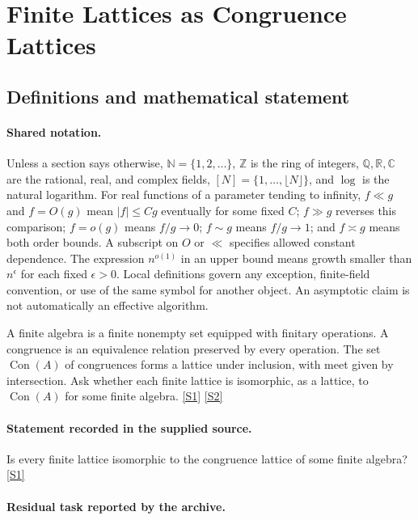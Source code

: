 \documentclass[11pt,a4paper]{article}
\newcommand{\N}{\mathbb{N}}
\newcommand{\Z}{\mathbb{Z}}
\newcommand{\Q}{\mathbb{Q}}
\newcommand{\R}{\mathbb{R}}
\newcommand{\C}{\mathbb{C}}
\newcommand{\sref}[2]{\hyperlink{source:#1:#2}{[S#2]}}
\begin{document}
\section{Finite Lattices as Congruence Lattices}\label{statement}


\subsection{Definitions and mathematical statement}

\paragraph{Shared notation.}Unless a section says otherwise, $\N=\{1,2,\ldots\}$,
$\Z$ is the ring of integers, $\Q,\R,\C$ are the rational, real, and complex
fields, $[N]=\{1,\ldots,\lfloor N\rfloor\}$, and $\log$ is the natural
logarithm. For real functions of a parameter tending to infinity,
$f\ll g$ and $f=O(g)$ mean $|f|\leq Cg$ eventually for some fixed $C$;
$f\gg g$ reverses this comparison; $f=o(g)$ means $f/g\to0$;
$f\sim g$ means $f/g\to1$; and $f\asymp g$ means both order bounds.
A subscript on $O$ or $\ll$ specifies allowed constant dependence.
The expression $n^{o(1)}$ in an upper bound means growth smaller than
$n^\epsilon$ for each fixed $\epsilon>0$. Local definitions govern any
exception, finite-field convention, or use of the same symbol for another
object. An asymptotic claim is not automatically an effective algorithm.



A finite algebra is a finite nonempty set equipped with finitary operations. A congruence is an equivalence relation preserved by every operation. The set $\operatorname{Con}(A)$ of congruences forms a lattice under inclusion, with meet given by intersection. Ask whether each finite lattice is isomorphic, as a lattice, to $\operatorname{Con}(A)$ for some finite algebra. \sref{statement}{1} \sref{statement}{2}

\paragraph{Statement recorded in the supplied source.}
Is every finite lattice isomorphic to the congruence lattice of some finite algebra? \sref{statement}{1}

\paragraph{Residual task reported by the archive.}
\end{document}
